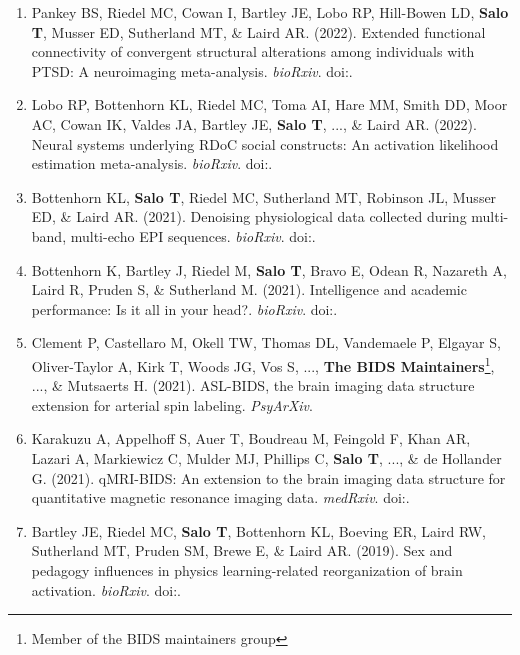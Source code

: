 \documentclass[10pt]{article}
\newcommand{\sectionstyle}{\LARGE \fontfamily{lmr}\selectfont}
\newcommand{\textlink}[3][blue]{\href{#2}{\color{#1}{#3}}}
\begin{document}
\bigskip

\begin{center}\sectionstyle{PREPRINTS}\end{center}

\begin{enumerate}

	\item Pankey BS, Riedel MC, Cowan I, Bartley JE, Lobo RP, Hill-Bowen LD, \textbf{Salo T}, Musser ED, Sutherland MT, \& Laird AR.
	(2022).
	Extended functional connectivity of convergent structural alterations among individuals with PTSD: A neuroimaging meta-analysis.
	\emph{bioRxiv}.
	doi:\textlink{https://doi.org/10.1101/2022.04.07.487478}{10.1101/2022.04.07.487478}.

	\item Lobo RP, Bottenhorn KL, Riedel MC, Toma AI, Hare MM, Smith DD, Moor AC, Cowan IK, Valdes JA, Bartley JE, \textbf{Salo T}, ..., \& Laird AR.
	(2022).
	Neural systems underlying RDoC social constructs: An activation likelihood estimation meta-analysis.
	\emph{bioRxiv}.
	doi:\textlink{https://doi.org/10.1101/2022.04.04.487016}{10.1101/2022.04.04.487016}.

	\item Bottenhorn KL, \textbf{Salo T}, Riedel MC, Sutherland MT, Robinson JL, Musser ED, \& Laird AR.
	(2021).
	Denoising physiological data collected during multi-band, multi-echo EPI sequences.
	\emph{bioRxiv}.
	doi:\textlink{https://doi.org/10.1101/2021.04.01.437293}{10.1101/2021.04.01.437293}.

	\item Bottenhorn K, Bartley J, Riedel M, \textbf{Salo T}, Bravo E, Odean R, Nazareth A, Laird R, Pruden S, \& Sutherland M.
	(2021).
	Intelligence and academic performance: Is it all in your head?.
	\emph{bioRxiv}.
	doi:\textlink{https://doi.org/10.1101/2021.01.23.427928}{10.1101/2021.01.23.427928}.

	\item Clement P, Castellaro M, Okell TW, Thomas DL, Vandemaele P, Elgayar S, Oliver-Taylor A, Kirk T, Woods JG, Vos S, ..., \textbf{The BIDS Maintainers}\footnote{Member of the BIDS maintainers group}, ..., \& Mutsaerts H.
	(2021).
	ASL-BIDS, the brain imaging data structure extension for arterial spin labeling.
	\emph{PsyArXiv}.

	\item Karakuzu A, Appelhoff S, Auer T, Boudreau M, Feingold F, Khan AR, Lazari A, Markiewicz C, Mulder MJ, Phillips C, \textbf{Salo T}, ..., \& de Hollander G.
	(2021).
	qMRI-BIDS: An extension to the brain imaging data structure for quantitative magnetic resonance imaging data.
	\emph{medRxiv}.
	doi:\textlink{https://doi.org/10.1101/2021.10.22.21265382}{10.1101/2021.10.22.21265382}.

	\item Bartley JE, Riedel MC, \textbf{Salo T}, Bottenhorn KL, Boeving ER, Laird RW, Sutherland MT, Pruden SM, Brewe E, \& Laird AR.
	(2019).
	Sex and pedagogy influences in physics learning-related reorganization of brain activation.
	\emph{bioRxiv}.
	doi:\textlink{https://doi.org/10.1101/791301}{10.1101/791301}.

\end{enumerate}
\end{document}
